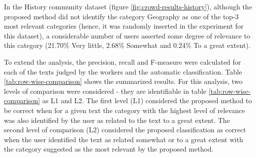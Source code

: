 In the History community dataset (figure \ref{fig:crowd-results-history}), although the proposed method did not identify the category Geography as one of the top-3 most relevant categories (hence, it was randomly inserted in the experiment for this dataset), a considerable number of users asserted some degree of relevance to this category (21.70\% Very little,  2.68\% Somewhat and 0.24\% To a great extent). 

To extend the analysis, the precision, recall and F-measure were calculated for each of the texts judged by the workers and the automatic classification. Table \ref{tab:row-wise-comparison} shows the summarized results. For this analysis, two levels of comparison were considered - they are identifiable in table \ref{tab:row-wise-comparison} as L1 and L2. The first level (L1) considered the proposed method to be correct when for a given text the category with the highest level of relevance was also identified by the user as related to the text to a great extent. The second level of comparison (L2) considered the proposed classification as correct when the user identified the text as related somewhat or to a great extent with the category suggested as the most relevant by the proposed method. 



